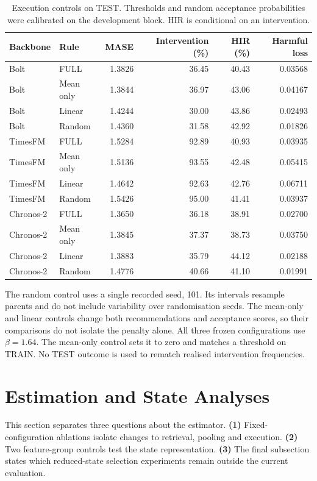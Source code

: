 \documentclass{article}
\begin{document}
\begin{table}[!t]
\centering\small
\caption{Execution controls on TEST. Thresholds and random acceptance probabilities were
calibrated on the development block. HIR is conditional on an intervention.}
\label{tab:v52-gates}
\begin{tabular*}{\textwidth}{@{\extracolsep{\fill}}llrrrr@{}}
\toprule
Backbone & Rule & MASE & Intervention (\%) & HIR (\%) & Harmful loss \\
\midrule
Bolt & FULL & 1.3826 & 36.45 & 40.43 & 0.03568 \\
Bolt & Mean only & 1.3844 & 36.97 & 43.06 & 0.04167 \\
Bolt & Linear & 1.4244 & 30.00 & 43.86 & 0.02493 \\
Bolt & Random & 1.4360 & 31.58 & 42.92 & 0.01826 \\
TimesFM & FULL & 1.5284 & 92.89 & 40.93 & 0.03935 \\
TimesFM & Mean only & 1.5136 & 93.55 & 42.48 & 0.05415 \\
TimesFM & Linear & 1.4642 & 92.63 & 42.76 & 0.06711 \\
TimesFM & Random & 1.5426 & 95.00 & 41.41 & 0.03937 \\
Chronos-2 & FULL & 1.3650 & 36.18 & 38.91 & 0.02700 \\
Chronos-2 & Mean only & 1.3845 & 37.37 & 38.73 & 0.03750 \\
Chronos-2 & Linear & 1.3883 & 35.79 & 44.12 & 0.02188 \\
Chronos-2 & Random & 1.4776 & 40.66 & 41.10 & 0.01991 \\
\bottomrule
\end{tabular*}
\end{table}

The random control uses a single recorded seed, 101. Its intervals resample parents and
do not include variability over randomisation seeds. The mean-only and linear controls change
both recommendations and acceptance scores, so their comparisons do not isolate the penalty
alone. All three frozen configurations use $\beta=1.64$. The mean-only control sets it to
zero and matches a threshold on TRAIN. No TEST outcome is used to rematch realised intervention
frequencies.

\section{Estimation and State Analyses}

This section separates three questions about the estimator. \textbf{(1)} Fixed-configuration ablations isolate changes to retrieval, pooling and execution. \textbf{(2)} Two feature-group controls test the state representation. \textbf{(3)} The final subsection states which reduced-state selection experiments remain outside the current evaluation.
\end{document}
